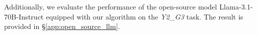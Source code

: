 \documentclass[11pt]{article}
\theoremstyle{plain}
\theoremstyle{remark}
\begin{document}
Additionally, we evaluate the performance of the open-source model Llama-3.1-70B-Instruct \citep{dubey2024llama3} equipped with our algorithm on the \emph{Y2\_G3} task. The result is provided in \S\ref{app:open_source_llm}.
\end{document}
